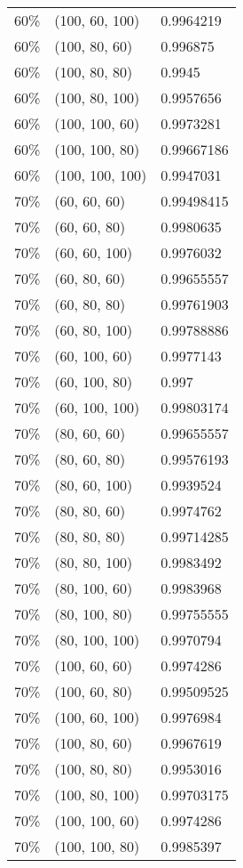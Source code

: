\documentclass[conference]{IEEEtran}
\begin{document}
\begin{table}
\begin{tabularx}{\columnwidth}{lXl}
    60\% & (100, 60, 100) & 0.9964219\\
    60\% & (100, 80, 60) & 0.996875\\
    60\% & (100, 80, 80) & 0.9945\\
    60\% & (100, 80, 100) & 0.9957656\\
    60\% & (100, 100, 60) & 0.9973281\\
    60\% & (100, 100, 80) & 0.99667186\\
    60\% & (100, 100, 100) & 0.9947031\\
    70\% & (60, 60, 60) & 0.99498415\\
    70\% & (60, 60, 80) & 0.9980635\\
    70\% & (60, 60, 100) & 0.9976032\\
    70\% & (60, 80, 60) & 0.99655557\\
    70\% & (60, 80, 80) & 0.99761903\\
    70\% & (60, 80, 100) & 0.99788886\\
    70\% & (60, 100, 60) & 0.9977143\\
    70\% & (60, 100, 80) & 0.997\\
    70\% & (60, 100, 100) & 0.99803174\\
    70\% & (80, 60, 60) & 0.99655557\\
    70\% & (80, 60, 80) & 0.99576193\\
    70\% & (80, 60, 100) & 0.9939524\\
    70\% & (80, 80, 60) & 0.9974762\\
    70\% & (80, 80, 80) & 0.99714285\\
    70\% & (80, 80, 100) & 0.9983492\\
    70\% & (80, 100, 60) & 0.9983968\\
    70\% & (80, 100, 80) & 0.99755555\\
    70\% & (80, 100, 100) & 0.9970794\\
    70\% & (100, 60, 60) & 0.9974286\\
    70\% & (100, 60, 80) & 0.99509525\\
    70\% & (100, 60, 100) & 0.9976984\\
    70\% & (100, 80, 60) & 0.9967619\\
    70\% & (100, 80, 80) & 0.9953016\\
    70\% & (100, 80, 100) & 0.99703175\\
    70\% & (100, 100, 60) & 0.9974286\\
    70\% & (100, 100, 80) & 0.9985397\\

\end{tabularx}
\end{table}
\end{document}
